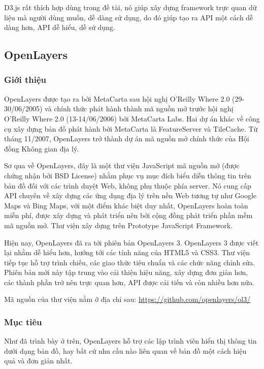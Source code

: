 \documentclass[12pt,a4paper]{article}
\begin{document}
D3.js rất thích hợp dùng trong đề tài, nó giúp xây dựng framework trực quan dữ liệu mà người dùng muốn, dễ dàng sử dụng, do đó giúp tạo ra API một cách dễ dàng hơn, API dễ hiểu, dễ sử dụng.

\subsection{OpenLayers}
\subsubsection{Giới thiệu}
OpenLayers\cite{ol} được tạo ra bởi MetaCarta sau hội nghị O'Reilly Where 2.0 (29-30/06/2005) và chính thức phát hành thành mã nguồn mở trước hội nghị  O'Reilly Where 2.0 (13-14/06/2006) bởi MetaCarta Labs. Hai dự án khác về công cụ xây dựng bản đồ phát hành bởi MetaCarta là FeatureServer và TileCache. Từ tháng 11/2007, OpenLayers trở thành dự án mã nguồn mở chính thức của Hội đồng Không gian địa lý.

Sơ qua về OpenLayers, đây là một thư viện JavaScript mã nguồn mở (được chứng nhận bởi BSD License) nhằm phục vụ mục đích biểu diễn thông tin trên bản đồ  đối với các trình duyệt Web, không phụ thuộc phía server. Nó cung cấp API chuyên về xây dựng các ứng dụng địa lý trên nền Web tương tự như Google Maps\cite{googlemap} và Bing Maps\cite{bingmap}, với một điểm khác biệt duy nhất, OpenLayers hoàn toàn miễn phí, được xây dựng và phát triển nên bởi cộng đồng phát triển phần mềm mã nguồn mở. Thư viện xây dựng trên Prototype JavaScript Framework\cite{prototypejs}.

Hiện nay, OpenLayers đã ra tới phiên bản OpenLayers 3\cite{ol3}. OpenLayers 3 được viết lại nhằm dễ hiểu hơn, hướng tới các tính năng của HTML5 và CSS3. Thư viện tiếp tục hỗ trợ trình chiếu, các giao thức tiêu chuẩn và các chức năng chỉnh sửa. Phiên bản mới này tập trung vào cải thiện hiệu năng, xây dựng đơn giản hơn, các thành phần trở nên trực quan hơn, API được cải tiến và còn nhiều hơn nữa.

Mã nguồn của thư viện nằm ở địa chỉ sau: \url{https://github.com/openlayers/ol3/}

\subsubsection{Mục tiêu}
Như đã trình bày ở trên, OpenLayers hỗ trợ các lập trình viên hiển thị thông tin dưới dạng bản đồ, hay bất cứ nhu cầu nào liên quan về bản đồ một cách hiệu quả và đơn giản nhất.
\end{document}
